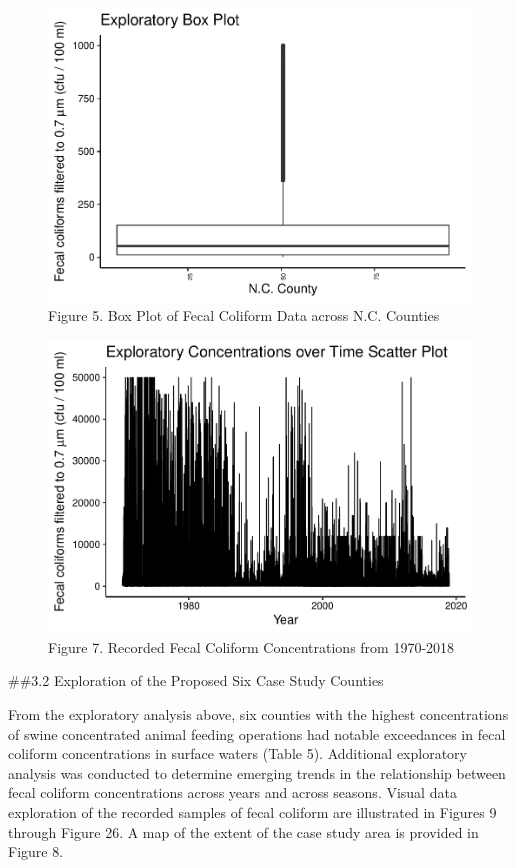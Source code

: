 \documentclass[12pt,]{article}
\begin{document}
\begin{figure}
\centering
\includegraphics{Edmondson_ENV872_Project_files/figure-latex/unnamed-chunk-4-1.pdf}
\caption{Figure 5. Box Plot of Fecal Coliform Data across N.C. Counties}
\end{figure}

\begin{figure}
\centering
\includegraphics{Edmondson_ENV872_Project_files/figure-latex/unnamed-chunk-6-1.pdf}
\caption{Figure 7. Recorded Fecal Coliform Concentrations from
1970-2018}
\end{figure}

\#\#3.2 Exploration of the Proposed Six Case Study Counties

From the exploratory analysis above, six counties with the highest
concentrations of swine concentrated animal feeding operations had
notable exceedances in fecal coliform concentrations in surface waters
(Table 5). Additional exploratory analysis was conducted to determine
emerging trends in the relationship between fecal coliform
concentrations across years and across seasons. Visual data exploration
of the recorded samples of fecal coliform are illustrated in Figures 9
through Figure 26. A map of the extent of the case study area is
provided in Figure 8.
\end{document}
